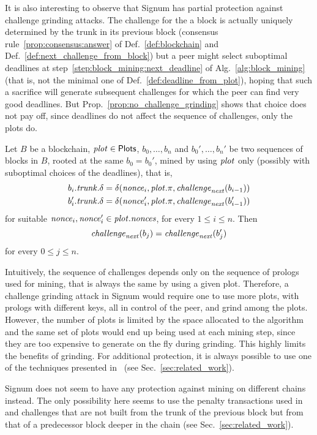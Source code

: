 It is also interesting to observe that Signum has partial protection
against challenge grinding attacks.
The challenge for the a block is actually uniquely determined by the trunk in its
previous block
(consensus rule~\ref{prop:consensus:answer} of Def.~\ref{def:blockchain}
and Def.~\ref{def:next_challenge_from_block}) but a peer
might select suboptimal deadlines at step~\ref{step:block_mining:next_deadline}
of Alg.~\ref{alg:block_mining} (that is, not the minimal one of Def.~\ref{def:deadline_from_plot}),
hoping that such a sacrifice will generate subsequent challenges for which the peer
can find very good deadlines.
But Prop.~\ref{prop:no_challenge_grinding} shows that choice does not pay off, since deadlines do not
affect the sequence of challenges, only the plots do.
%
\begin{proposition}\label{prop:no_challenge_grinding}
  Let $B$ be a blockchain, ${\mathit{plot}}\in{\mathsf{Plots}}$, $b_0,\ldots,b_n$ and
  $b_0',\ldots,b_n'$ be two sequences of blocks in $B$, rooted at the same
  $b_0=b_0'$, mined by using ${\mathit{plot}}$ only
  (possibly with suboptimal choices of the deadlines), that is,
  \begin{align*}
    b_i.{\mathit{trunk}}.\delta&=\delta({\mathit{nonce}}_i,{\mathit{plot}}.\pi,{\mathit{challenge}}_{\mathit{next}}(b_{i-1}))\\
    b'_i.{\mathit{trunk}}.\delta&=\delta({\mathit{nonce}}'_i,{\mathit{plot}}.\pi,{\mathit{challenge}}_{\mathit{next}}(b'_{i-1}))
  \end{align*}
  for suitable ${\mathit{nonce}}_i,{\mathit{nonce}}_i'\in{\mathit{plot}}.{\mathit{nonces}}$, for every $1\le i\le n$. Then
  \[
  {\mathit{challenge}}_{\mathit{next}}(b_j)={\mathit{challenge}}_{\mathit{next}}(b'_j)
  \]
  for every $0\le j\le n$.
\end{proposition}
%
Intuitively, the sequence of challenges depends only on
the sequence of prologs used for mining, that is always the same by using a given plot.
Therefore, a challenge grinding attack in Signum
would require one to use more plots, with prologs with different keys, all in control of the peer,
and grind among the plots. However, the number of plots is limited by the space
allocated to the algorithm and the same set of plots
would end up being used at each mining step, since they are too expensive to generate
on the fly during grinding. This highly
limits the benefits of grinding. For additional protection, it is always possible to use
one of the techniques presented in~\cite{ParkKFGAP18} (see Sec.~\ref{sec:related_work}).

Signum does not seem to have any protection against mining on different chains instead.
The only possibility here seems to use the penalty transactions used in~\cite{ParkKFGAP18}
and challenges that
are not built from the trunk of the previous block but from that of a predecessor block deeper in the chain
(see Sec.~\ref{sec:related_work}).

